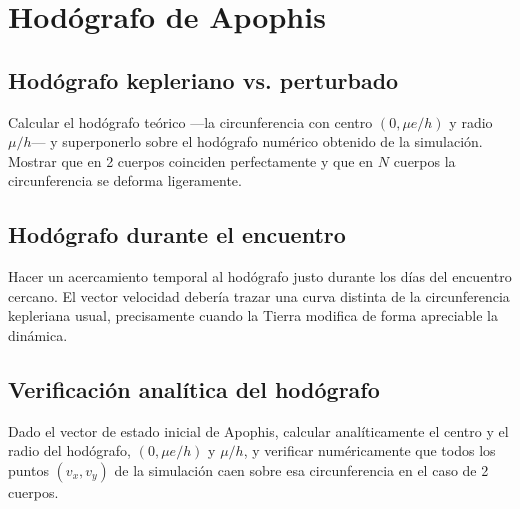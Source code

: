 \section{Hodógrafo de Apophis}

\subsection{Hodógrafo kepleriano vs. perturbado}

Calcular el hodógrafo teórico ---la circunferencia con centro $(0, \mu e / h)$ y radio $\mu / h$--- y superponerlo sobre el hodógrafo numérico obtenido de la simulación. Mostrar que en 2 cuerpos coinciden perfectamente y que en $N$ cuerpos la circunferencia se deforma ligeramente.

\subsection{Hodógrafo durante el encuentro}

Hacer un acercamiento temporal al hodógrafo justo durante los días del encuentro cercano. El vector velocidad debería trazar una curva distinta de la circunferencia kepleriana usual, precisamente cuando la Tierra modifica de forma apreciable la dinámica.

\subsection{Verificación analítica del hodógrafo}

Dado el vector de estado inicial de Apophis, calcular analíticamente el centro y el radio del hodógrafo, $(0, \mu e / h)$ y $\mu / h$, y verificar numéricamente que todos los puntos $(v_x, v_y)$ de la simulación caen sobre esa circunferencia en el caso de 2 cuerpos.